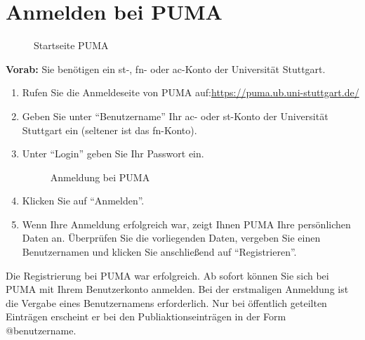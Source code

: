 \section{Anmelden bei PUMA} 
\begin{figure}[h!]
 \centering
 \caption{Startseite PUMA}
 \label{figure001}
\end{figure}
\textbf{Vorab:} Sie benötigen ein st-, fn- oder ac-Konto der Universität Stuttgart.
\begin{enumerate}
    \item Rufen Sie die Anmeldeseite von PUMA auf:\newline \url{https://puma.ub.uni-stuttgart.de/}
    \item Geben Sie unter \enquote{Benutzername} Ihr ac- oder st-Konto der Universität Stuttgart ein (seltener ist das fn-Konto). 
    \item Unter  \enquote{Login} geben Sie Ihr Passwort ein. 
 \begin{figure}[h!]
 \centering
 \caption{Anmeldung bei PUMA}
 \label{figure002}
\end{figure}  
    \item Klicken Sie auf \enquote{Anmelden}.
    \item Wenn Ihre Anmeldung erfolgreich war, zeigt Ihnen PUMA Ihre persönlichen Daten an. Überprüfen Sie die vorliegenden Daten, vergeben Sie einen Benutzernamen und klicken Sie anschließend auf \enquote{Registrieren}.
\end{enumerate}
Die Registrierung bei PUMA war erfolgreich. Ab sofort können Sie sich bei PUMA mit Ihrem Benutzerkonto anmelden. \newline
Bei der erstmaligen Anmeldung ist die Vergabe eines Benutzernamens erforderlich. Nur bei öffentlich geteilten Einträgen erscheint er bei den Publiaktionseinträgen in der Form @benutzername.
